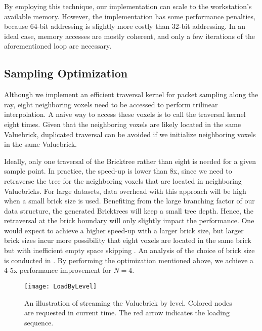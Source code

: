 By employing this technique, our implementation can scale to the workstation's available
memory. However, the implementation has some performance penalties, because 64-bit addressing is slightly more costly than 32-bit addressing. In an ideal case, memory accesses are mostly coherent, and only a few iterations of the aforementioned loop are necessary.


\subsection{Sampling Optimization}
Although we implement an efficient traversal kernel for packet sampling along the ray,
eight neighboring voxels need to be accessed to perform trilinear interpolation.
A naive way to access these voxels is to call the traversal kernel eight
times. Given that the neighboring voxels are likely located in the same Valuebrick,
duplicated traversal can be avoided if we initialize neighboring voxels in the same
Valuebrick. 

Ideally, only one traversal of the Bricktree rather than eight is needed for a given 
sample point. In practice, the speed-up is lower than 8x, since we need to
retraverse the tree for the neighboring voxels that are located in neighboring
Valuebricks. 
For large datasets, 
data overhead with this approach will be high when a small brick size is used. Benefiting 
from the large branching factor of our data structure, the generated Bricktrees will keep
a small tree depth. Hence, the retraversal at the brick boundary will only slightly impact the performance. 
One would expect to achieve a higher speed-up with a larger brick size, but larger
brick sizes incur more possibility that eight voxels are located in the same brick
but with inefficient empty space skipping
\cite{fogal2013analysis}. An analysis of the choice of brick size is conducted in
. 
By performing the optimization mentioned above, we achieve a 4-5x
performance improvement for $N=4$. 

\begin{figure}[h]
  \centering
    \texttt{[image: LoadByLevel]}
    \caption{\label{fig:loadbylevel}An illustration of streaming the Valuebrick by level. Colored nodes are requested in current time. The red arrow indicates the loading sequence.}
\end{figure}




